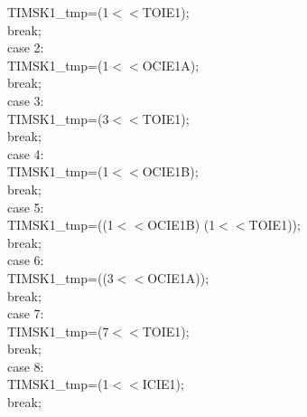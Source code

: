 \documentclass[titlepage, a4paper, 10pt, reqno, openany]{report}
\begin{document}
\begin{minipage}[t]{.35\linewidth}
\hspace*{1.5cm}			TIMSK1\_tmp=(1$<<$TOIE1); \\
\hspace*{1.5cm}			break; \\
\hspace*{1cm}		case 2: \\
\hspace*{1.5cm}			TIMSK1\_tmp=(1$<<$OCIE1A); \\
\hspace*{1.5cm}			break; \\
\hspace*{1cm}		case 3: \\
\hspace*{1.5cm}			TIMSK1\_tmp=(3$<<$TOIE1); \\
\hspace*{1.5cm}			break; \\
\hspace*{1cm}		case 4: \\
\hspace*{1.5cm}			TIMSK1\_tmp=(1$<<$OCIE1B); \\
\hspace*{1.5cm}			break; \\
\hspace*{1cm}		case 5: \\
\hspace*{1.5cm}			TIMSK1\_tmp=((1$<<$OCIE1B) \textbar (1$<<$TOIE1)); \\
\hspace*{1.5cm}			break; \\
\hspace*{1cm}		case 6: \\
\hspace*{1.5cm}			TIMSK1\_tmp=((3$<<$OCIE1A)); \\
\hspace*{1.5cm}			break; \\
\hspace*{1cm}		case 7: \\
\hspace*{1.5cm}			TIMSK1\_tmp=(7$<<$TOIE1); \\
\hspace*{1.5cm}			break; \\
\hspace*{1cm}		case 8: \\
\hspace*{1.5cm}			TIMSK1\_tmp=(1$<<$ICIE1); \\
\hspace*{1.5cm}			break; \\

\end{minipage}
\end{document}
